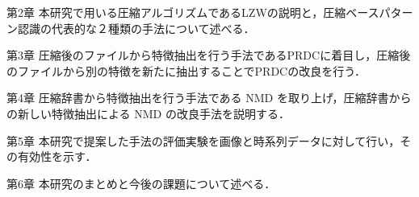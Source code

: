\begin{description}
	\item{第2章} 本研究で用いる圧縮アルゴリズムであるLZWの説明と，圧縮ベースパターン認識の代表的な２種類の手法について述べる．
	\item{第3章} 圧縮後のファイルから特徴抽出を行う手法であるPRDCに着目し，圧縮後のファイルから別の特徴を新たに抽出することでPRDCの改良を行う．
	\item{第4章} 圧縮辞書から特徴抽出を行う手法である NMD を取り上げ，圧縮辞書からの新しい特徴抽出による NMD の改良手法を説明する．
	\item{第5章} 本研究で提案した手法の評価実験を画像と時系列データに対して行い，その有効性を示す．
	\item{第6章} 本研究のまとめと今後の課題について述べる．
\end{description}
